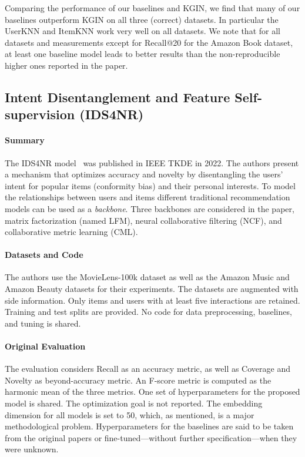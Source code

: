 \documentclass[sigconf,natbib=true,nonacm]{acmart}
\begin{document}
Comparing the performance of our baselines and KGIN, we find that many of our baselines outperform KGIN on all three (correct) datasets. In particular the UserKNN and ItemKNN work very well on all datasets.  We note that for all datasets and measurements except for Recall@20 for the Amazon Book dataset, at least one baseline model leads to better results than the non-reproducible higher ones reported in the paper.


\subsection{Intent Disentanglement and Feature Self-supervision (IDS4NR)}
\label{sec:IDS4NR}

\paragraph{Summary} The IDS4NR model~\cite{qian2022intent} was published in IEEE TKDE in 2022. The authors present a mechanism that optimizes accuracy and novelty by disentangling the users' intent for popular items (conformity bias) and their personal interests. To model the relationships between users and items different traditional recommendation models can be used as a \emph{backbone}. Three backbones are considered in the paper, matrix factorization (named LFM), neural collaborative filtering (NCF), and collaborative metric learning (CML).

\paragraph{Datasets and Code} The authors use the MovieLens-100k dataset as well as the Amazon Music and Amazon Beauty datasets for their experiments. The datasets are augmented with side information. Only items and users with at least five interactions are retained. Training and test splits are provided. No code for data preprocessing, baselines, and tuning is shared.

\paragraph{Original Evaluation} The evaluation considers Recall as an accuracy metric, as well as Coverage and Novelty as beyond-accuracy metric. An F-score metric is computed as the harmonic mean of the three metrics. One set of hyperparameters for the proposed model is shared. The optimization goal is not reported. The embedding dimension for all models is set to 50, which, as mentioned, is a major methodological problem. Hyperparameters for the baselines are said to be taken from the original papers or fine-tuned---without further specification---when they were unknown.
\end{document}
